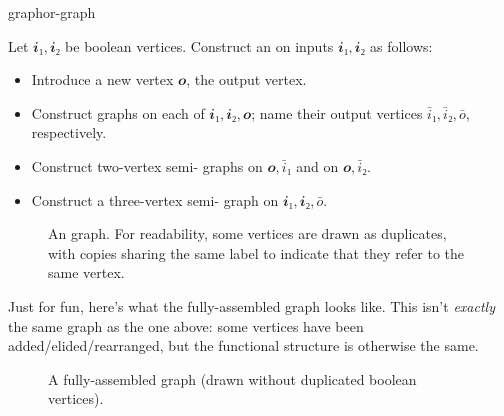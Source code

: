 \begin{definition}{\OR{} graph}{or-graph}

  Let \(𝒊₁,𝒊₂\) be boolean vertices.  Construct an  on inputs
  \(𝒊₁,𝒊₂\) as follows:
  \begin{itemize}[nosep]
    \item Introduce a new vertex \(𝒐\), the output vertex.
    \item Construct \NOT{} graphs on each of \(𝒊₁,𝒊₂,𝒐\); name their output
      vertices \(\bar i₁,\bar i₂,\bar o\), respectively.
    \item Construct two-vertex semi-\OR{} graphs on \(𝒐,\bar i₁\) and on
      \(𝒐,\bar i₂\).
    \item Construct a three-vertex semi-\OR{} graph on \(𝒊₁,𝒊₂,\bar o\).
  \end{itemize}

  \begin{figure}[H]
    \begin{center}
      \caption{An \OR{} graph. For readability, some vertices are drawn as
        duplicates, with copies sharing the same label to indicate that they
      refer to the same vertex.}
    \end{center}
  \end{figure}

  \begin{aside}
    Just for fun, here's what the fully-assembled \OR{} graph looks like.  This
    isn't \emph{exactly} the same graph as the one above: some 
    vertices have been added/elided/rearranged, but the functional structure is
    otherwise the same.

    \begin{figure}[H]
    \begin{center}

      \caption{A fully-assembled \OR{} graph (drawn without duplicated boolean vertices).}
    \end{center}
  \end{figure}
  \end{aside}

\end{definition}

